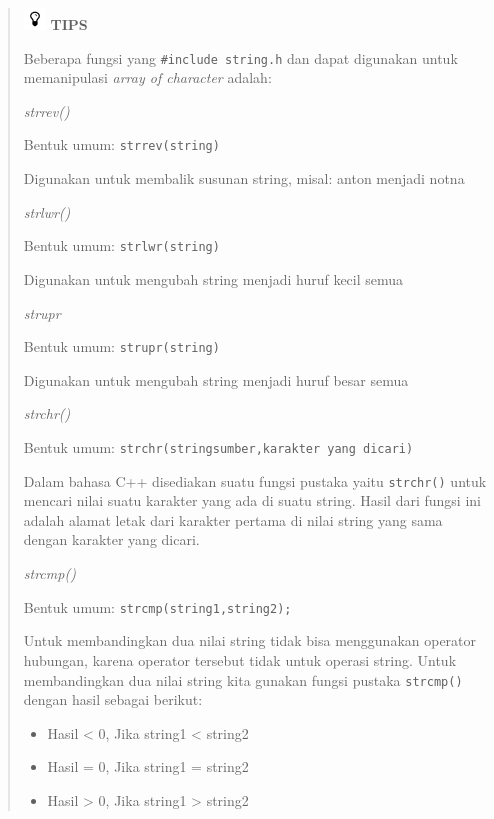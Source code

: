 \begin{quotation}
\includegraphics{../manuscript/images/tips.png}	\textbf{TIPS}
	
	Beberapa fungsi yang \texttt{\#include\ string.h} dan dapat digunakan
	untuk memanipulasi \emph{array of character} adalah:
	
	\emph{strrev()}
	
	Bentuk umum: \texttt{strrev(string)}
	
	Digunakan untuk membalik susunan string, misal: anton menjadi notna
	
	\emph{strlwr()}
	
	Bentuk umum: \texttt{strlwr(string)}
	
	Digunakan untuk mengubah string menjadi huruf kecil semua
	
	\emph{strupr}
	
	Bentuk umum: \texttt{strupr(string)}
	
	Digunakan untuk mengubah string menjadi huruf besar semua
	
	\emph{strchr()}
	
	Bentuk umum: \texttt{strchr(stringsumber,karakter\ yang\ dicari)}
	
	Dalam bahasa C++ disediakan suatu fungsi pustaka yaitu \texttt{strchr()}
	untuk mencari nilai suatu karakter yang ada di suatu string. Hasil dari
	fungsi ini adalah alamat letak dari karakter pertama di nilai string
	yang sama dengan karakter yang dicari.
	
	\emph{strcmp()}
	
	Bentuk umum: \texttt{strcmp(string1,string2);}
	
	Untuk membandingkan dua nilai string tidak bisa menggunakan operator
	hubungan, karena operator tersebut tidak untuk operasi string. Untuk
	membandingkan dua nilai string kita gunakan fungsi pustaka
	\texttt{strcmp()} dengan hasil sebagai berikut:
	
	\begin{itemize}
		
		\item
		Hasil \textless{} 0, Jika string1 \textless{} string2
		\item
		Hasil = 0, Jika string1 = string2
		\item
		Hasil \textgreater{} 0, Jika string1 \textgreater{} string2
	\end{itemize}
\end{quotation}


